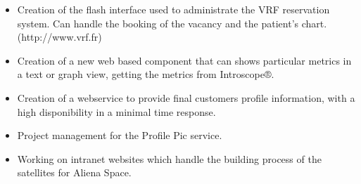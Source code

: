 \documentclass[10pt,a4paper]{altacv}
\begin{document}
\begin{itemize}
\item Creation of the flash interface used to administrate the VRF reservation   system. Can handle the booking of the vacancy and the patient's chart. (http://www.vrf.fr) 
\end{itemize}
\divider

\begin{itemize}
\item Creation of a new web based component that can shows particular metrics in a text or graph view, getting the metrics from Introscope®.
\end{itemize}
\divider

\begin{itemize}
\item Creation of a webservice to provide final customers profile information, with a high disponibility in a minimal time response.
\item Project management for the Profile Pic service.
\end{itemize}
\divider

\begin{itemize}
\item Working on intranet websites which handle the building process of the satellites for Aliena Space.
\end{itemize}


\end{document}

